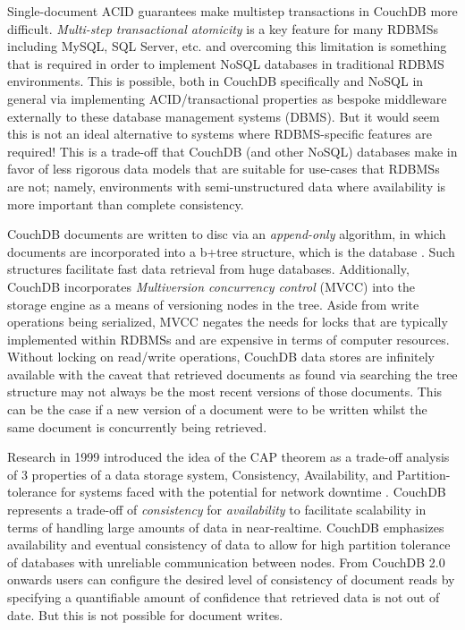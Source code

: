 Single-document ACID guarantees make multistep transactions in CouchDB more difficult. \textit{Multi-step transactional atomicity} is a key feature for many RDBMSs including MySQL, SQL Server, etc. and overcoming this limitation is something that is required in order to implement NoSQL databases in traditional RDBMS environments. This is possible, both in CouchDB specifically \cite{Rashmi2017} and NoSQL in general \cite{LOTFY2016133} via implementing ACID/transactional properties as bespoke middleware externally to these database management systems (DBMS). But it would seem this is not an ideal alternative to systems where RDBMS-specific features are required! This is a trade-off that CouchDB (and other NoSQL) databases make in favor of less rigorous data models that are suitable for use-cases that RDBMSs are not; namely, environments with semi-unstructured data where availability is more important than complete consistency.

CouchDB documents are written to disc via an \textit{append-only} algorithm, in which documents are incorporated into a b+tree structure, which is the database \cite{couchguide}. Such structures facilitate fast data retrieval from huge databases. Additionally, CouchDB incorporates \textit{Multiversion concurrency control} (MVCC) into the storage engine as a means of versioning nodes in the tree. Aside from write operations being serialized, MVCC negates the needs for locks that are typically implemented within RDBMSs and are expensive in terms of computer resources. Without locking on read/write operations, CouchDB data stores are infinitely available with the caveat that retrieved documents as found via searching the tree structure may not always be the most recent versions of those documents. This can be the case if a new version of a document were to be written whilst the same document is concurrently being retrieved.

Research in 1999 introduced the idea of the CAP theorem as a trade-off analysis of 3 properties of a data storage system, Consistency, Availability, and Partition-tolerance for systems faced with the potential for network downtime \cite{cap}. CouchDB represents a trade-off of \textit{consistency} for \textit{availability} to facilitate scalability in terms of handling large amounts of data in near-realtime. CouchDB emphasizes availability and eventual consistency of data to allow for high partition tolerance of databases with unreliable communication between nodes. From CouchDB 2.0 onwards users can configure the desired level of consistency of document reads by specifying a quantifiable amount of confidence that retrieved data is not out of date. But this is not possible for document writes.

